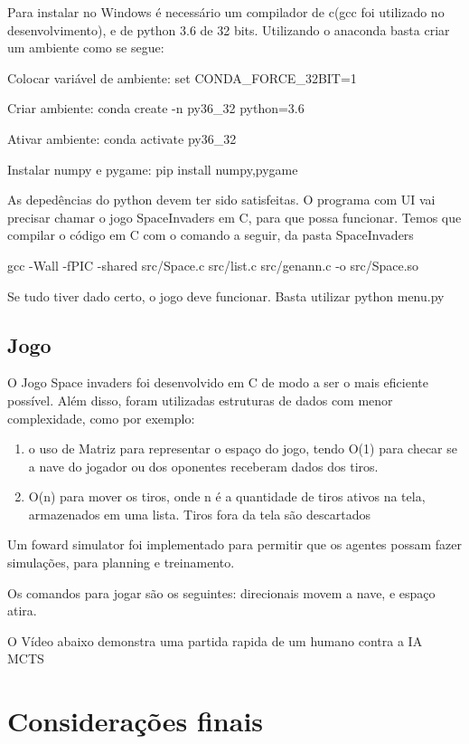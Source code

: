 \documentclass[]{book}
\begin{document}
Para instalar no Windows é necessário um compilador de c(gcc foi
utilizado no desenvolvimento), e de python 3.6 de 32 bits. Utilizando o
anaconda basta criar um ambiente como se segue:

Colocar variável de ambiente: set CONDA\_FORCE\_32BIT=1

Criar ambiente: conda create -n py36\_32 python=3.6

Ativar ambiente: conda activate py36\_32

Instalar numpy e pygame: pip install numpy,pygame

As depedências do python devem ter sido satisfeitas. O programa com UI
vai precisar chamar o jogo SpaceInvaders em C, para que possa funcionar.
Temos que compilar o código em C com o comando a seguir, da pasta
SpaceInvaders

gcc -Wall -fPIC -shared src/Space.c src/list.c src/genann.c -o
src/Space.so

Se tudo tiver dado certo, o jogo deve funcionar. Basta utilizar python
menu.py

\section{Jogo}\label{jogo}

O Jogo Space invaders foi desenvolvido em C de modo a ser o mais
eficiente possível. Além disso, foram utilizadas estruturas de dados com
menor complexidade, como por exemplo:

\begin{enumerate}
\def\labelenumi{\arabic{enumi}.}
\item
  o uso de Matriz para representar o espaço do jogo, tendo O(1) para
  checar se a nave do jogador ou dos oponentes receberam dados dos
  tiros.
\item
  O(n) para mover os tiros, onde n é a quantidade de tiros ativos na
  tela, armazenados em uma lista. Tiros fora da tela são descartados
\end{enumerate}

Um foward simulator foi implementado para permitir que os agentes possam
fazer simulações, para planning e treinamento.

Os comandos para jogar são os seguintes: direcionais movem a nave, e
espaço atira.

O Vídeo abaixo demonstra uma partida rapida de um humano contra a IA
MCTS

\chapter{Considerações finais}\label{considerauxe7uxf5es-finais}
\end{document}
